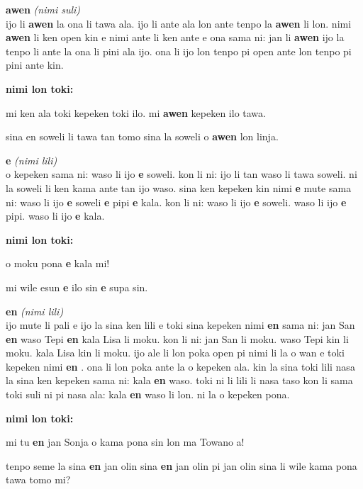 \documentclass[a4paper,11pt]{book}
\newenvironment{definition}[2]{ %
  \begin{minipage}{\dimexpr\textwidth}
  \begin{description}
  \item
    {\huge \textbf{#1}}
    {\Large \textit{(#2)}} \\
}{
  \end{description}
  \end{minipage}
}
\newenvironment{example}{ %
  \item
  \textbf{nimi lon toki:}

  \hfill
  \begin{minipage}{\dimexpr\textwidth-1cm}
  \begin{itshape}
}
{
  \end{itshape}
  \end{minipage}
}
\newcommand{\inex}[1]{%
  \textbf{#1}%
}
\begin{document}
\begin{definition}{awen}{nimi suli}
  ijo li \inex{awen} la ona li tawa ala. ijo li ante ala lon ante tenpo la \inex{awen} li lon. nimi \inex{awen} li ken open kin e nimi ante li ken ante e ona sama ni: jan li \inex{awen} ijo la tenpo li ante la ona li pini ala ijo. ona li ijo lon tenpo pi open ante lon tenpo pi pini ante kin.
  \begin{example}
    mi ken ala toki kepeken toki ilo. mi \inex{awen} kepeken ilo tawa.
    
    sina en soweli li tawa tan tomo sina la soweli o \inex{awen} lon linja.
  \end{example}
\end{definition}

\begin{definition}{e}{nimi lili}
  o kepeken sama ni: waso li ijo \inex{e} soweli. kon li ni: ijo li tan waso li tawa soweli. ni la soweli li ken kama ante tan ijo waso. sina ken kepeken kin nimi \inex{e} mute sama ni: waso li ijo \inex{e} soweli \inex{e} pipi \inex{e} kala. kon li ni: waso li ijo \inex{e} soweli. waso li ijo \inex{e} pipi. waso li ijo \inex{e} kala.
  \begin{example}
    o moku pona \inex{e} kala mi!
    
    mi wile esun \inex{e} ilo sin \inex{e} supa sin.
  \end{example}
\end{definition}

\begin{definition}{en}{nimi lili}
  ijo mute li pali e ijo la sina ken lili e toki sina kepeken nimi \inex{en} sama ni: jan San \inex{en} waso Tepi \inex{en} kala Lisa li moku. kon li ni: jan San li moku. waso Tepi kin li moku. kala Lisa kin li moku. ijo ale li lon poka open pi nimi li la o wan e toki kepeken nimi \inex{en}. ona li lon poka ante la o kepeken ala. kin la sina toki lili nasa la sina ken kepeken sama ni: kala \inex{en} waso. toki ni li lili li nasa taso kon li sama toki suli ni pi nasa ala: kala \inex{en} waso li lon. ni la o kepeken pona.
  \begin{example}
    mi tu \inex{en} jan Sonja o kama pona sin lon ma Towano a!
    
    tenpo seme la sina \inex{en} jan olin sina \inex{en} jan olin pi jan olin sina li wile kama pona tawa tomo mi?
  \end{example}
\end{definition}

\end{document}
